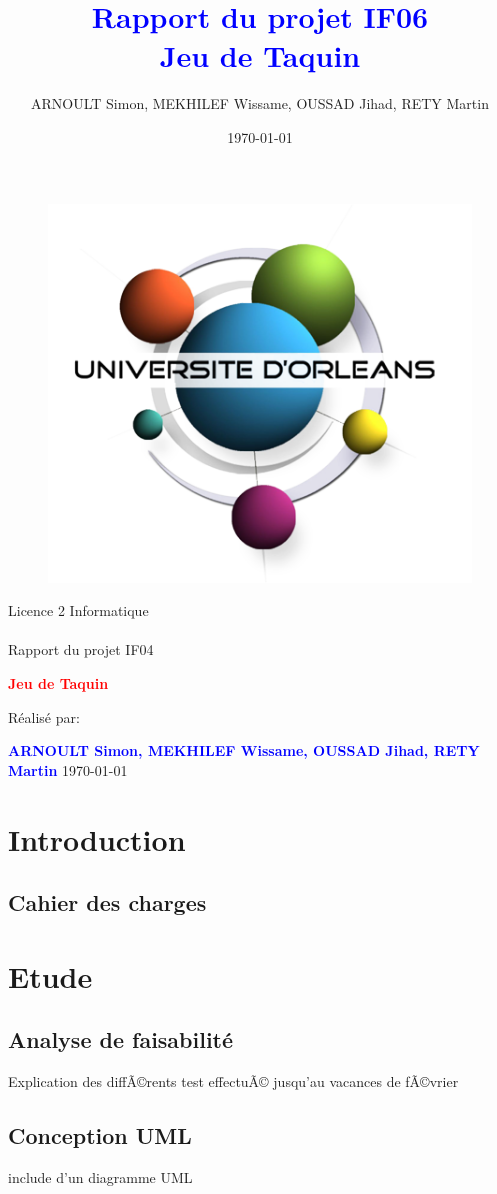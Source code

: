 \documentclass[a4paper,twoside,12pt]{report}
\title{\textcolor{blue}{\Large Rapport du projet IF06}\\\textcolor{blue}{\Large Jeu de Taquin}}
\author{ARNOULT Simon, MEKHILEF Wissame, OUSSAD Jihad, RETY Martin \date{\today}}
\begin{document}
\thispagestyle{empty}
%
\begin{figure}[H]
\includegraphics[width=0.2\linewidth]{Logo-univ-orleans.png}

\end{figure}
\vspace{2cm}
%
\begin{center}
{\Huge Licence 2 Informatique\\\ \\Rapport du projet IF04}
\par\vspace{1.4cm}

{\Huge\bf \textcolor{red}{\bf Jeu de Taquin}}
\par\vspace{1.6cm}

{\Large       Réalisé par:}
\par\vspace{1.3cm}
{\large\bf \textcolor{blue}{ARNOULT Simon, MEKHILEF Wissame, OUSSAD Jihad, RETY Martin}}
\vfill
\today
\end{center}
\newpage
\pagestyle{fancy}

\begin{abstract}
%
\end{abstract}
 
\newpage
\tableofcontents
\listoffigures
\newpage

\chapter{Introduction}
% 
\section{Cahier des charges}
%
\chapter{Etude}
%
\section{Analyse de faisabilité}
Explication des diffÃ©rents test effectuÃ© jusqu'au vacances de fÃ©vrier 
\section{Conception UML}
include d'un diagramme UML 
\end{document}
